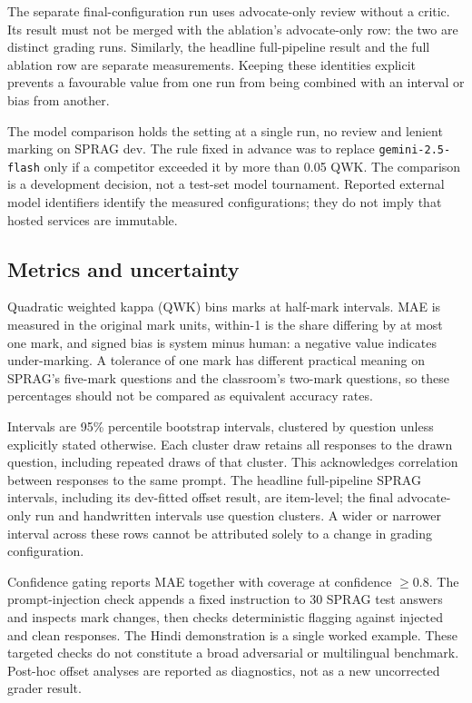 The separate final-configuration run uses advocate-only review without a critic. Its result must not be merged with the ablation's advocate-only row: the two are distinct grading runs. Similarly, the headline full-pipeline result and the full ablation row are separate measurements. Keeping these identities explicit prevents a favourable value from one run from being combined with an interval or bias from another.

The model comparison holds the setting at a single run, no review and lenient marking on SPRAG dev. The rule fixed in advance was to replace \texttt{gemini-2.5-flash} only if a competitor exceeded it by more than 0.05 QWK. The comparison is a development decision, not a test-set model tournament. Reported external model identifiers identify the measured configurations; they do not imply that hosted services are immutable.

\subsection{Metrics and uncertainty}
Quadratic weighted kappa (QWK) bins marks at half-mark intervals. MAE is measured in the original mark units, within-1 is the share differing by at most one mark, and signed bias is system minus human: a negative value indicates under-marking. A tolerance of one mark has different practical meaning on SPRAG's five-mark questions and the classroom's two-mark questions, so these percentages should not be compared as equivalent accuracy rates.

Intervals are 95\% percentile bootstrap intervals, clustered by question unless explicitly stated otherwise. Each cluster draw retains all responses to the drawn question, including repeated draws of that cluster. This acknowledges correlation between responses to the same prompt. The headline full-pipeline SPRAG intervals, including its dev-fitted offset result, are item-level; the final advocate-only run and handwritten intervals use question clusters. A wider or narrower interval across these rows cannot be attributed solely to a change in grading configuration.

Confidence gating reports MAE together with coverage at confidence $\geq 0.8$. The prompt-injection check appends a fixed instruction to 30 SPRAG test answers and inspects mark changes, then checks deterministic flagging against injected and clean responses. The Hindi demonstration is a single worked example. These targeted checks do not constitute a broad adversarial or multilingual benchmark. Post-hoc offset analyses are reported as diagnostics, not as a new uncorrected grader result.
